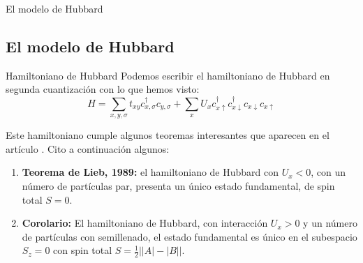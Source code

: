 \documentclass{beamer}
\begin{document}
\begin{frame}{El modelo de Hubbard \cite{MielkeHubbard}}
    \subsection{El modelo de Hubbard}
    \begin{block}{Hamiltoniano de Hubbard}
        Podemos escribir el hamiltoniano de Hubbard en segunda cuantización con lo que hemos visto:
        \begin{equation}
            H = \sum_{x, y, \sigma}t_{xy}c^{\dagger}_{x,\sigma}c_{y,\sigma} + \sum_x U_x c^{\dagger}_{x\uparrow}c^{\dagger}_{x\downarrow}c_{x\downarrow}c_{x\uparrow}
        \end{equation}
    \end{block}
    Este hamiltoniano cumple algunos teoremas interesantes que aparecen en el artículo \cite{MielkeHubbard}. Cito a continuación algunos:
    \begin{enumerate}
        \item \textbf{Teorema de Lieb, 1989:} el hamiltoniano de Hubbard con $U_x < 0$, con un número de partículas par, presenta un único estado fundamental, de spin total $S = 0$.
        \item \textbf{Corolario:} El hamiltoniano de Hubbard, con interacción $U_x > 0$ y un número de partículas con semillenado, el estado fundamental es único en el subespacio $S_z = 0$ con spin total $S = \frac{1}{2}\left||A| - |B|\right|$.
    \end{enumerate}
\end{frame}
\end{document}
